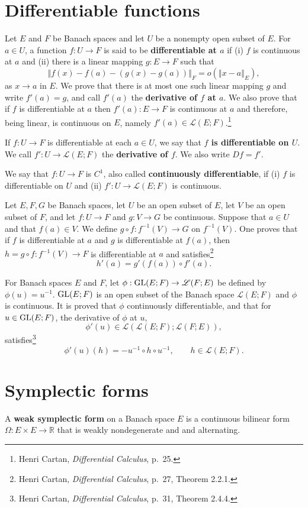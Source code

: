 \documentclass{article}
\newcommand{\GL}{\ensuremath\mathrm{GL}}
\newcommand{\norm}[1]{\left\Vert #1 \right\Vert}
\theoremstyle{definition}
\begin{document}
\section{Differentiable functions}
Let $E$ and $F$ be Banach spaces and  let $U$ be a nonempty open subset of $E$.
For $a \in U$, a function $f:U \to F$  is said to be \textbf{differentiable at $a$} if (i) $f$ is continuous at $a$ and (ii)
there is a linear mapping $g:E \to F$ such that
\[
\norm{f(x)-f(a)-(g(x)-g(a))}_F = o(\norm{x-a}_E),
\]
as $x \to a$ in $E$. 
We prove that there is at most one such linear mapping $g$ and write $f'(a)=g$, and call $f'(a)$ the \textbf{derivative of $f$ at $a$}.
 We also prove that
if $f$ is differentiable at $a$ then $f'(a):E \to F$ is continuous at $a$ and therefore, being linear, is continuous on $E$, namely
$f'(a) \in \mathscr{L}(E;F)$.\footnote{Henri Cartan, {\em Differential Calculus}, p.~25.}

If $f:U \to F$ is differentiable at each $a \in U$, we say that \textbf{$f$ is differentiable on $U$}.
We call $f':U \to \mathscr{L}(E;F)$ the \textbf{derivative of $f$}. We also write $Df=f'$.

We say that $f:U \to F$ is $C^1$, also called \textbf{continuously differentiable}, if (i) $f$ is differentiable on $U$ and (ii) $f':U \to \mathscr{L}(E;F)$ is continuous.

Let $E,F,G$ be Banach spaces, let $U$ be an open subset of $E$,  let $V$ be an open subset of $F$, and let
$f:U \to F$ and $g:V \to G$ be continuous. Suppose that $a \in U$ and that $f(a) \in V$. We define
$g \circ f:f^{-1}(V) \to G$ on $f^{-1}(V)$. One proves that if $f$ is differentiable at $a$ and $g$ is differentiable at $f(a)$, then
$h=g \circ f:f^{-1}(V) \to F$ is differentiable at $a$ and satisfies\footnote{Henri Cartan, {\em Differential Calculus}, p.~27, Theorem 2.2.1.}
\[
h'(a) = g'(f(a)) \circ f'(a).
\]

For Banach spaces $E$ and $F$, 
let $\phi:\GL(E;F) \to \mathscr{L}(F;E)$ be defined by $\phi(u)=u^{-1}$. $\GL(E;F)$ is an open subset of
the Banach space $\mathscr{L}(E;F)$ and
 $\phi$ is continuous. It is proved that $\phi$ continuously differentiable, and that for $u \in \GL(E;F)$,
the derivative of $\phi$ at $u$,
\[
\phi'(u) \in \mathscr{L}(\mathscr{L}(E;F);  \mathscr{L}(F;E)),
\]
 satisfies\footnote{Henri Cartan, {\em Differential Calculus}, p.~31, Theorem 2.4.4.}
 \[
 \phi'(u)(h) = -u^{-1} \circ h \circ u^{-1}, \qquad h \in \mathscr{L}(E;F).
 \]



\section{Symplectic forms}
A \textbf{weak symplectic form} on a Banach space $E$ is a continuous bilinear form $\Omega:E \times E \to \mathbb{R}$ that is weakly nondegenerate and 
and alternating. 
\end{document}
